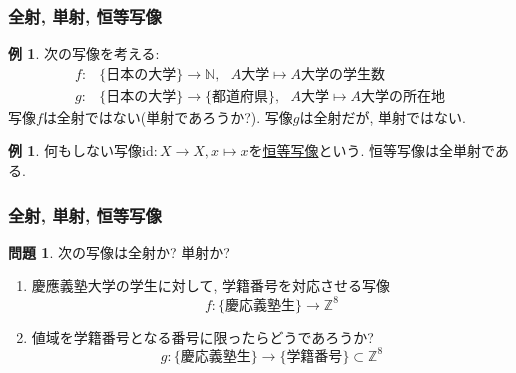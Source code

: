 \documentclass[dvipdfmx,cjk,10.2pt]{beamer}
\newcommand{\Z}{\mathbb{Z}}
\newcommand{\N}{\mathbb{N}}
\newcommand{\id}{\mathrm{id}}
\theoremstyle{definition}
\newtheorem{Ex}[Thm]{例}
\newtheorem{Prob}[Thm]{問題}
\begin{document}


\begin{frame}
\frametitle{全射, 単射, 恒等写像}

\begin{Ex}
次の写像を考える: 
\begin{align*}
f: & \{\text{日本の大学}\} \longrightarrow \N, \ \ \ \text{$A$大学} \mapsto \text{$A$大学の学生数} \\
g:& \{\text{日本の大学}\} \longrightarrow \{\text{都道府県}\}, \ \ \ \text{$A$大学} \mapsto \text{$A$大学の所在地}
\end{align*}
写像$f$は全射ではない(単射であろうか?). 写像$g$は全射だが, 単射ではない. 
\end{Ex}


\begin{Ex}
何もしない写像$\id :X \rightarrow X, x \mapsto x$を\underline{恒等写像}という. 
恒等写像は全単射である. 
\end{Ex}


\end{frame}





\begin{frame}
\frametitle{全射, 単射, 恒等写像}

\begin{Prob}
次の写像は全射か? 単射か? 
\begin{enumerate}
\item 慶應義塾大学の学生に対して, 学籍番号を対応させる写像
$$
f:\{ \text{慶応義塾生}\} \longrightarrow \Z^8
$$
\item 値域を学籍番号となる番号に限ったらどうであろうか? 
$$
g:\{ \text{慶応義塾生}\} \longrightarrow \{ \text{学籍番号}\} \subset \Z^8
$$
\end{enumerate}
\end{Prob}

\end{frame}




\end{document}
